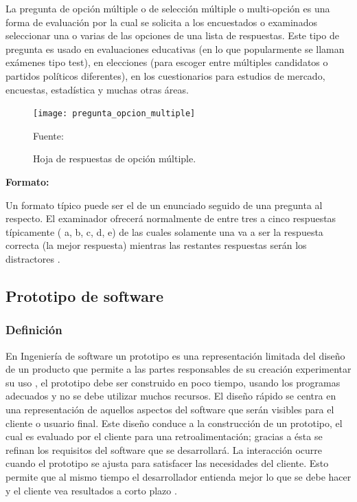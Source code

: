 La pregunta de opción múltiple o de selección múltiple o multi-opción es una forma de evaluación por la cual se solicita a los encuestados o examinados seleccionar una o varias de las opciones de una lista de respuestas.
\vskip 1cm 
Este tipo de pregunta es usado en evaluaciones educativas (en lo que popularmente se llaman exámenes tipo test), en elecciones (para escoger entre múltiples candidatos o partidos políticos diferentes), en los cuestionarios para estudios de mercado, encuestas, estadística y muchas otras áreas.

\begin{figure}[ht]
	\begin{center}
		\texttt{[image: pregunta\_opcion\_multiple]}
	\end{center}
	\begin{center}
		\vskip -0.5cm
		\caption{\small{Hoja de respuestas de opción múltiple.}}
		{\small{Fuente: \citep{pregunta_opcion_multiple}}}
	\end{center}
\end{figure}
 
{\bf Formato:}\par

Un formato típico puede ser el de un enunciado seguido de una pregunta al respecto. El examinador ofrecerá normalmente de entre tres a cinco respuestas típicamente ( a, b, c, d, e) de las cuales solamente una va a ser la respuesta correcta (la mejor respuesta) mientras las restantes respuestas serán los distractores \citep{salkind}.
\vskip 1cm 


\subsection{Prototipo de software}

\subsubsection{Definición}

En Ingeniería de software un prototipo es una representación limitada del diseño de un producto que permite a las partes responsables de su creación experimentar su uso \citep{pressman_troya}, el prototipo debe ser construido en poco tiempo, usando los programas adecuados y no se debe utilizar muchos recursos.
\vskip 0.3cm
El diseño rápido se centra en una representación de aquellos aspectos del software que serán visibles para el cliente o usuario final. Este diseño conduce a la construcción de un prototipo, el cual es evaluado por el cliente para una retroalimentación; gracias a ésta se refinan los requisitos del software que se desarrollará. La interacción ocurre cuando el prototipo se ajusta para satisfacer las necesidades del cliente. Esto permite que al mismo tiempo el desarrollador entienda mejor lo que se debe hacer y el cliente vea resultados a corto plazo \citep{pressman_troya}.


